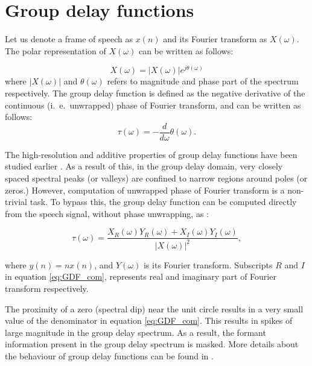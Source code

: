 \documentclass[conference]{IEEEtran}
\begin{document}
\section{Group delay functions}
\label{fe}
Let us denote a frame of speech as $x(n)$ and its Fourier transform as
$X(\omega)$. The polar representation of $X(\omega)$ can be written as follows:

\begin{equation}
X(\omega) = |X(\omega)| e^{j\theta(\omega)} 
\label{equ:FT}
\end{equation}     
where $|X(\omega)|$ and $\theta(\omega)$ refers to magnitude and phase part of
the spectrum respectively. The group delay function is defined as the
negative derivative of the continuous (i.~e.~unwrapped) phase of Fourier transform, and can be written
as follows: 
\begin{equation}
\tau(\omega) =  - \frac{d}{d\omega} \theta(\omega).
\label{equ:GDF_def}
\end{equation}

The high-resolution and additive properties of group delay functions have been
studied earlier \cite{yegnaJASA, gdSurvey}. As a result of this, in the
group delay domain, very closely
spaced spectral peaks (or valleys) are confined to narrow regions around poles
(or zeros.) However, computation of unwrapped phase of Fourier transform is a
non-trivial task. To bypass this, the group delay function can be computed
directly from the speech signal, without phase unwrapping, as
\cite{gdDerivationIcassp}:

\begin{equation}
\tau(\omega) = \frac{X_R(\omega)Y_R(\omega) +
X_I(\omega)Y_I(\omega)}{|X(\omega)|^{2}},
\label{eq:GDF_com}
\end{equation}

where $y(n) = n x(n)$, and $Y(\omega)$ is its Fourier transform. 
Subscripts $R$ and $I$ in equation \ref{eq:GDF_com}, represents real and
imaginary part of Fourier transform respectively. 

The proximity of a zero (spectral dip) near the
unit circle results in a very small value of the denominator in
equation \ref{eq:GDF_com}. This results in spikes of large magnitude in the group
delay spectrum. As a result, the formant information present in the group delay
spectrum is masked. More details about the behaviour of group delay functions
can be found in \cite{gdSurvey}.
\end{document}
